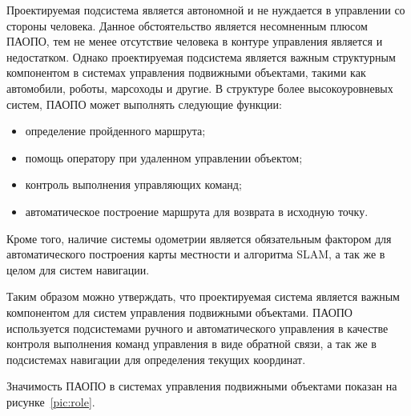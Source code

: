 Проектируемая подсистема является автономной и не нуждается в управлении со стороны человека. Данное обстоятельство является несомненным плюсом ПАОПО, тем не менее отсутствие человека в контуре управления является и недостатком. Однако проектируемая подсистема является важным структурным компонентом в системах управления подвижными объектами, такими как автомобили, роботы, марсоходы и другие. В структуре более высокоуровневых систем, ПАОПО может выполнять следующие функции:
\begin{itemize}
\item определение пройденного маршрута;
\item помощь оператору при удаленном управлении объектом;
\item контроль выполнения управляющих команд; 
\item автоматическое построение маршрута для возврата в исходную точку.

\end{itemize}

Кроме того, наличие системы одометрии является обязательным фактором для автоматического построения карты местности и алгоритма SLAM, а так же в целом для систем навигации.

Таким образом можно утверждать, что проектируемая система является важным компонентом для систем управления подвижными объектами. ПАОПО используется подсистемами ручного и автоматического управления в качестве контроля выполнения команд управления в виде обратной связи, а так же в подсистемах навигации для определения текущих координат. 

Значимость ПАОПО в системах управления подвижными объектами показан на рисунке~\ref{pic:role}.


